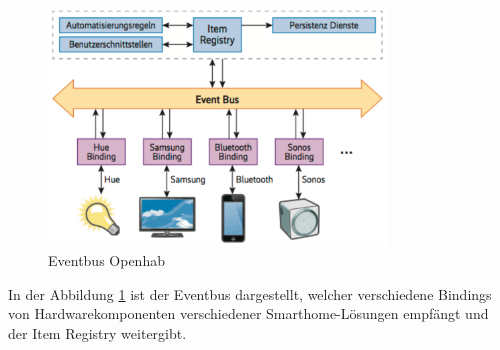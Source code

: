   \begin{figure}[H]
 	\centering
 	\includegraphics[width=0.8\textwidth]{graphics/Eventbus.PNG}
 	\caption{Eventbus Openhab \cite{noauthor_durchbruch_nodate} }	
 	\label{pic: Eventbus}
 \end{figure} 
 
 In der Abbildung \ref{pic: Eventbus} ist der Eventbus dargestellt, welcher verschiedene Bindings von Hardwarekomponenten verschiedener Smarthome-Lösungen empfängt und der Item Registry weitergibt.